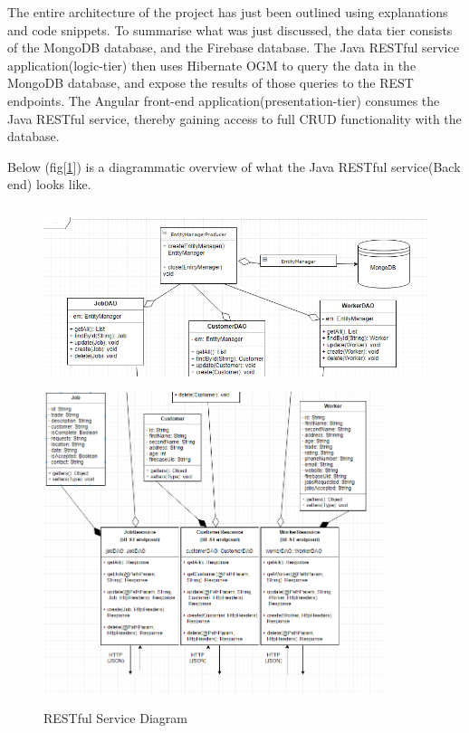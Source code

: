 The entire architecture of the project has just been outlined using explanations and code snippets. To summarise what was just discussed, the data tier consists of the MongoDB database, and the Firebase database. The Java RESTful service application(logic-tier) then uses Hibernate OGM to query the data in the MongoDB database, and expose the results of those queries to the REST endpoints. The Angular front-end application(presentation-tier) consumes the Java RESTful service, thereby gaining access to full CRUD functionality with the database. 



Below (fig[\ref{fig:back}]) is a diagrammatic overview of what the Java RESTful service(Back end) looks like.

\begin{figure}[H]
    \centering
    \includegraphics[width=\textwidth, height=150pt]{DesignImages/Server2.PNG}
    \includegraphics[width=\textwidth, height=250pt]{DesignImages/Server1.PNG}
    \caption{RESTful Service Diagram}
    \label{fig:back}
\end{figure}


